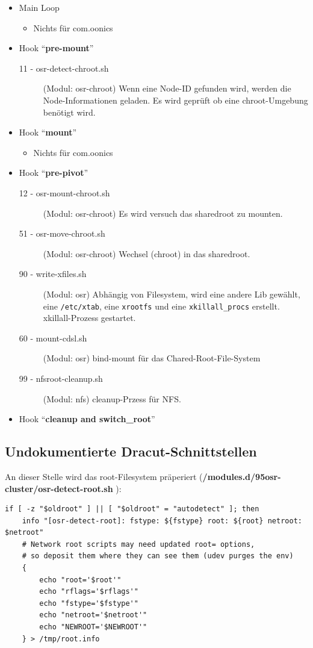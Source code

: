 \documentclass[10pt,a4paper]{article}
\begin{document}
\begin{itemize}
 \item Main Loop
    \begin{itemize}
      \item Nichts für com.oonics
    \end{itemize}
 \item Hook "`\textbf{pre-mount}"'
    \begin{description}
      \item [11 - osr-detect-chroot.sh] (Modul: osr-chroot) Wenn eine Node-ID
      gefunden wird, werden die Node-Informationen geladen. Es wird geprüft ob
      eine chroot-Umgebung benötigt wird.
    \end{description}
 \item Hook "`\textbf{mount}"'
    \begin{itemize}
      \item Nichts für com.oonics
    \end{itemize}
 \item Hook "`\textbf{pre-pivot}"'
    \begin{description}
      \item [12 - osr-mount-chroot.sh] (Modul: osr-chroot) Es wird versuch das
      sharedroot zu mounten.
      \item [51 - osr-move-chroot.sh] (Modul: osr-chroot) Wechsel (chroot) in
      das sharedroot.
      \item [90 - write-xfiles.sh] (Modul: osr) Abhängig von Filesystem, wird
      eine andere Lib gewählt, eine \texttt{/etc/xtab}, eine  \texttt{xrootfs}
      und eine \texttt{xkillall\_procs} erstellt.
      xkillall-Prozess gestartet.
      \item [60 - mount-cdsl.sh] (Modul: osr) bind-mount für das Chared-Root-File-System
      \item [99 - nfsroot-cleanup.sh] (Modul: nfs) cleanup-Przess für NFS.
    \end{description}
 \item Hook "`\textbf{cleanup and switch\_root}"'
\end{itemize}



\subsection{Undokumentierte Dracut-Schnittstellen}


An dieser Stelle wird das root-Filesystem präperiert (\textbf{/modules.d/95osr-cluster/osr-detect-root.sh} ):


\begin{lstlisting}
if [ -z "$oldroot" ] || [ "$oldroot" = "autodetect" ]; then
    info "[osr-detect-root]: fstype: ${fstype} root: ${root} netroot: $netroot"
    # Network root scripts may need updated root= options,
    # so deposit them where they can see them (udev purges the env)
    {
        echo "root='$root'"
        echo "rflags='$rflags'"
        echo "fstype='$fstype'"
        echo "netroot='$netroot'"
        echo "NEWROOT='$NEWROOT'"
    } > /tmp/root.info
\end{lstlisting}
\end{document}
